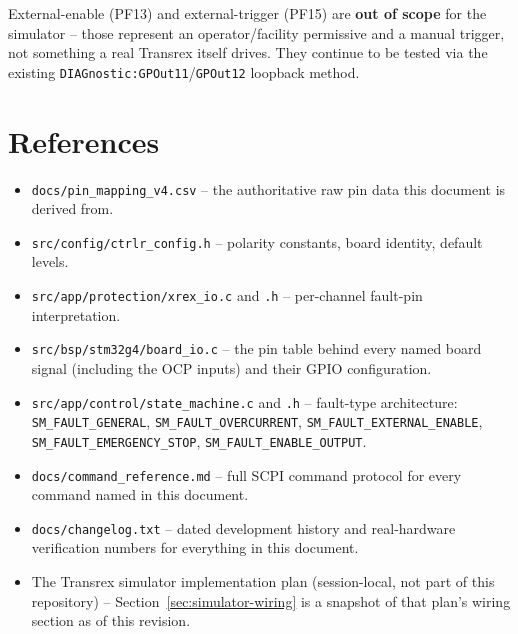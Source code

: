 \documentclass[11pt]{article}
\newcommand{\code}[1]{\texttt{#1}}
\begin{document}
External-enable (PF13) and external-trigger (PF15) are \textbf{out of
scope} for the simulator -- those represent an operator/facility
permissive and a manual trigger, not something a real Transrex itself
drives. They continue to be tested via the existing
\code{DIAGnostic:GPOut11}/\code{GPOut12} loopback method.

\section{References}

{\small
\begin{itemize}
  \item \code{docs/pin\_mapping\_v4.csv} -- the authoritative raw pin
    data this document is derived from.
  \item \code{src/config/ctrlr\_config.h} -- polarity constants, board
    identity, default levels.
  \item \code{src/app/protection/xrex\_io.c} and \code{.h} --
    per-channel fault-pin interpretation.
  \item \code{src/bsp/stm32g4/board\_io.c} -- the pin table behind
    every named board signal (including the OCP inputs) and their GPIO
    configuration.
  \item \code{src/app/control/state\_machine.c} and \code{.h} --
    fault-type architecture:
    \code{SM\_FAULT\_GENERAL}, \code{SM\_FAULT\_OVERCURRENT},
    \code{SM\_FAULT\_EXTERNAL\_ENABLE}, \code{SM\_FAULT\_EMERGENCY\_STOP},
    \code{SM\_FAULT\_ENABLE\_OUTPUT}.
  \item \code{docs/command\_reference.md} -- full SCPI command
    protocol for every command named in this document.
  \item \code{docs/changelog.txt} -- dated development history and
    real-hardware verification numbers for everything in this
    document.
  \item The Transrex simulator implementation plan (session-local, not
    part of this repository) -- Section~\ref{sec:simulator-wiring} is a
    snapshot of that plan's wiring section as of this revision.
\end{itemize}
}
\end{document}
